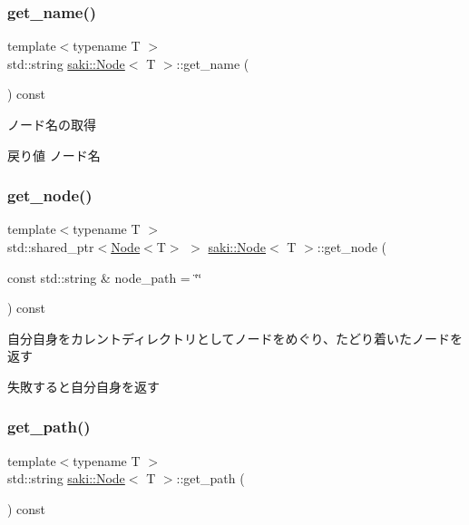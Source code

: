 \subsubsection{\texorpdfstring{get\+\_\+name()}{get\_name()}}
{\footnotesize\ttfamily template$<$typename T $>$ \\
std\+::string \mbox{\hyperlink{classsaki_1_1_node}{saki\+::\+Node}}$<$ T $>$\+::get\+\_\+name (\begin{DoxyParamCaption}{ }\end{DoxyParamCaption}) const\hspace{0.3cm}{\ttfamily [inline]}}



ノード名の取得 

\begin{DoxyReturn}{戻り値}
ノード名 
\end{DoxyReturn}
\mbox{\label{classsaki_1_1_node_aa94a7a9a0de9e7d6c5cc362493edc5f5}} 
\subsubsection{\texorpdfstring{get\+\_\+node()}{get\_node()}}
{\footnotesize\ttfamily template$<$typename T $>$ \\
std\+::shared\+\_\+ptr$<$\mbox{\hyperlink{classsaki_1_1_node}{Node}}$<$T$>$ $>$ \mbox{\hyperlink{classsaki_1_1_node}{saki\+::\+Node}}$<$ T $>$\+::get\+\_\+node (\begin{DoxyParamCaption}\item[{const std\+::string \&}]{node\+\_\+path = {\ttfamily \char`\"{}\char`\"{}} }\end{DoxyParamCaption}) const\hspace{0.3cm}{\ttfamily [inline]}}



自分自身をカレントディレクトリとしてノードをめぐり、たどり着いたノードを返す 

失敗すると自分自身を返す \mbox{\label{classsaki_1_1_node_a5aa0d398aa417048879bc71d51ce2aa3}} 
\subsubsection{\texorpdfstring{get\+\_\+path()}{get\_path()}}
{\footnotesize\ttfamily template$<$typename T $>$ \\
std\+::string \mbox{\hyperlink{classsaki_1_1_node}{saki\+::\+Node}}$<$ T $>$\+::get\+\_\+path (\begin{DoxyParamCaption}{ }\end{DoxyParamCaption}) const\hspace{0.3cm}{\ttfamily [inline]}}



